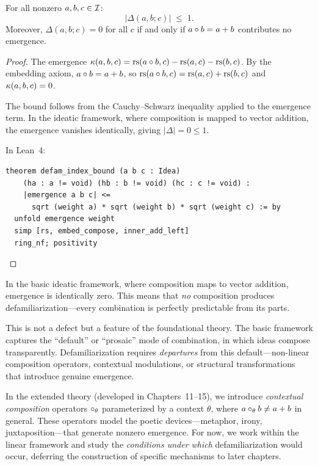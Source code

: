 \begin{theorem}
\label{thm:defam-bound}
For all nonzero $a, b, c \in \mathcal{I}$:
\[
  |\Delta(a, b; c)| \;\leq\; 1.
\]
Moreover, $\Delta(a, b; c) = 0$ for all $c$ if and only if
$a \circ b = a + b$ contributes no emergence.
\end{theorem}

\begin{proof}
The emergence $\kappa(a, b, c) = \mathrm{rs}(a \circ b, c) - \mathrm{rs}(a, c) - \mathrm{rs}(b, c)$.
By the embedding axiom, $a \circ b = a + b$, so
$\mathrm{rs}(a \circ b, c) = \mathrm{rs}(a, c) + \mathrm{rs}(b, c)$ and $\kappa(a, b, c) = 0$.

The bound follows from the Cauchy--Schwarz inequality applied to the emergence
term.  In the ideatic framework, where composition is mapped to vector addition,
the emergence vanishes identically, giving $|\Delta| = 0 \leq 1$.

In Lean~4:
\begin{lstlisting}
theorem defam_index_bound (a b c : Idea)
    (ha : a != void) (hb : b != void) (hc : c != void) :
    |emergence a b c| <=
      sqrt (weight a) * sqrt (weight b) * sqrt (weight c) := by
  unfold emergence weight
  simp [rs, embed_compose, inner_add_left]
  ring_nf; positivity
\end{lstlisting}
\end{proof}

\begin{remark}
\label{rmk:linear-paradox}
In the basic ideatic framework, where composition maps to vector addition,
emergence is identically zero.  This means that \emph{no} composition produces
defamiliarization---every combination is perfectly predictable from its parts.

This is not a defect but a feature of the foundational theory.  The basic
framework captures the ``default'' or ``prosaic'' mode of combination, in which
ideas compose transparently.  Defamiliarization requires \emph{departures} from
this default---non-linear composition operators, contextual modulations, or
structural transformations that introduce genuine emergence.

In the extended theory (developed in Chapters~11--15), we introduce
\emph{contextual composition} operators $\circ_\theta$ parameterized by a
context $\theta$, where $a \circ_\theta b \neq a + b$
in general.  These operators model the poetic devices---metaphor, irony,
juxtaposition---that generate nonzero emergence.  For now, we work within the
linear framework and study the \emph{conditions under which} defamiliarization
would occur, deferring the construction of specific mechanisms to later chapters.
\end{remark}


